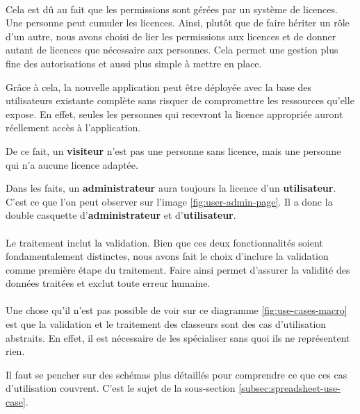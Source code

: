 \paragraph{}
Cela est dû au fait que les permissions sont gérées par un système de licences. Une personne peut cumuler les licences. Ainsi, plutôt que de faire hériter un rôle d'un autre, nous avons choisi de lier les permissions aux licences et de donner autant de licences que nécessaire aux personnes. Cela permet une gestion plus fine des autorisations et aussi plus simple à mettre en place.

Grâce à cela, la nouvelle application peut être déployée avec la base des utilisateurs existante complète sans risquer de compromettre les ressources qu'elle expose. En effet, seules les personnes qui recevront la licence appropriée auront réellement accès à l'application.

De ce fait, un \textbf{visiteur} n'est pas une personne sans licence, mais une personne qui n'a aucune licence adaptée.

Dans les faits, un \textbf{administrateur} aura toujours la licence d'un \textbf{utilisateur}. C'est ce que l'on peut observer sur l'image \ref{fig:user-admin-page}. Il a donc la double casquette d'\textbf{administrateur} et d'\textbf{utilisateur}.

\paragraph{}
Le traitement inclut la validation. Bien que ces deux fonctionnalités soient fondamentalement distinctes, nous avons fait le choix d'inclure la validation comme première étape du traitement. Faire ainsi permet d'assurer la validité des données traitées et exclut toute erreur humaine.

\paragraph{}
Une chose qu'il n'est pas possible de voir sur ce diagramme \ref{fig:use-cases-macro} est que la validation et le traitement des classeurs sont des cas d'utilisation abstraits. En effet, il est nécessaire de les spécialiser sans quoi ils ne représentent rien.

Il faut se pencher sur des schémas plus détaillés pour comprendre ce que ces cas d'utilisation couvrent. C'est le sujet de la sous-section \ref{subsec:spreadsheet-use-case}.
